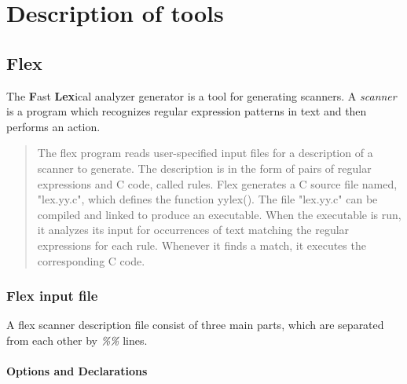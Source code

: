 \chapter{Description of tools}
\label{chap:TOOLS}


\section{Flex}

The {\Large\textbf{F}}ast {\Large\textbf{Lex}}ical analyzer generator is a tool
for generating scanners. A \emph{scanner} is a program which recognizes
regular expression patterns in text and then performs an action.
 \begin{quote}
The flex program reads user-specified input files for a description 
of a scanner to generate. The description is in the form of 
pairs of regular expressions and C code, called rules. Flex generates a C 
source file named, "lex.yy.c", which defines the function yylex(). The file 
"lex.yy.c" can be compiled and linked to produce an executable. When the 
executable is run, it analyzes its input for occurrences of text matching the 
regular expressions for each rule. Whenever it finds a match, it executes the 
corresponding C code.\citep*{FLEX}
\end{quote}

\subsection{Flex input file}

A flex scanner description file consist of three main parts, which are 
separated from each other by \emph{\%\%} lines.

\subsubsection{Options and Declarations}

